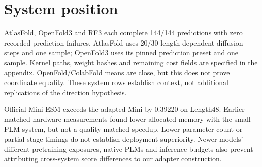 \section{System position}
\label{sec:6}


AtlasFold, OpenFold3 and RF3 each complete 144/144 predictions with zero
recorded prediction failures. AtlasFold uses 20/30 length-dependent diffusion
steps and one sample; OpenFold3 uses its pinned prediction preset and one
sample. Kernel paths, weight hashes and remaining cost fields are specified
in the appendix. OpenFold/ColabFold means are close, but this does not prove
coordinate equality. These system rows establish context, not additional
replications of the direction hypothesis.

Official Mini-ESM exceeds the adapted Mini by 0.39220 on Length48. Earlier
matched-hardware measurements found lower allocated memory with the small-PLM
system, but not a quality-matched speedup. Lower parameter count or partial
stage timings do not establish deployment superiority. Newer models' different
pretraining exposures, native PLMs and inference budgets also prevent attributing
cross-system score differences to our adapter construction.
